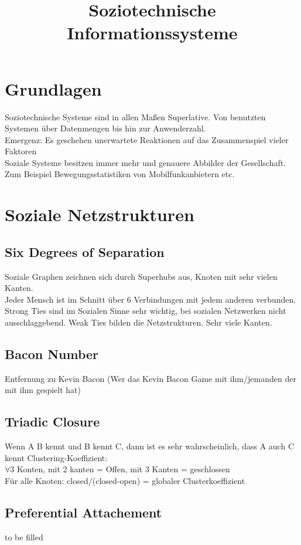 \documentclass[a4paper]{article}
\begin{document}
\title{Soziotechnische Informationssysteme}
\maketitle
\section{Grundlagen}
Soziotechnische Systeme sind in allen Maßen Superlative. Von benutzten Systemen über Datenmengen bis hin zur Anwenderzahl.\\
Emergenz: Es geschehen unerwartete Reaktionen auf das Zusammenspiel vieler Faktoren\\
Soziale Systeme besitzen immer mehr und genauere Abbilder der Gesellschaft. Zum Beispiel Bewegungsstatistiken von Mobilfunkanbietern etc.\\
\section{Soziale Netzstrukturen}
\subsection{Six Degrees of Separation}
Soziale Graphen zeichnen sich durch Superhubs aus, Knoten mit sehr vielen Kanten.\\
Jeder Mensch ist im Schnitt über 6 Verbindungen mit jedem anderen verbunden.\\
Strong Ties sind im Sozialen Sinne sehr wichtig, bei sozialen Netzwerken nicht ausschlaggebend. Weak Ties bilden die Netzstrukturen. 
Sehr viele Kanten.
\subsection{Bacon Number}
Entfernung zu Kevin Bacon (Wer das Kevin Bacon Game mit ihm/jemanden der mit ihm gespielt hat)
\subsection{Triadic Closure}
Wenn A B kennt und B kennt C, dann ist es sehr wahrscheinlich, dass A auch C kennt
Clustering-Koeffizient:\\
$\forall$3 Konten, mit 2 kanten = Offen, mit 3 Kanten = geschlossen\\
Für alle Knoten: closed/(closed-open) = globaler Clusterkoeffizient\\
\subsection{Preferential Attachement}
to be filled
\end{document}
